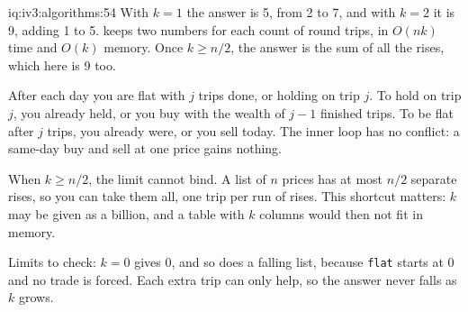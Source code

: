\begin{solution}{iq:iv3:algorithms:54}
With $k = 1$ the answer is 5, from 2 to 7, and with $k = 2$ it is 9, adding 1 to 5.  keeps two numbers for each count of round trips, in $O(nk)$ time and $O(k)$ memory. Once $k \ge n/2$, the answer is the sum of all the rises, which here is 9 too.
\label{lst:iv3:al:ktrades}

After each day you are flat with $j$ trips done, or holding on trip $j$. To hold on trip $j$, you already held, or you buy with the wealth of $j - 1$ finished trips. To be flat after $j$ trips, you already were, or you sell today. The inner loop has no conflict: a same-day buy and sell at one price gains nothing.

When $k \ge n/2$, the limit cannot bind. A list of $n$ prices has at most $n/2$ separate rises, so you can take them all, one trip per run of rises. This shortcut matters: $k$ may be given as a billion, and a table with $k$ columns would then not fit in memory.

Limits to check: $k = 0$ gives 0, and so does a falling list, because \texttt{flat} starts at 0 and no trade is forced. Each extra trip can only help, so the answer never falls as $k$ grows.

\end{solution}

